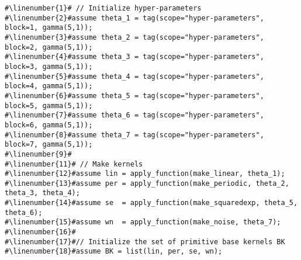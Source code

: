 \begin{mdframed}
\begin{minipage}{\linewidth}
\small
\belowcaptionskip=-10pt
\begin{lstlisting}[mathescape,label=alg:base_kernels,basicstyle=\selectfont\ttfamily,numbers=none,caption={Initialize
Base Kernels BK and $P(n)$},escapechar=\#]
#\linenumber{1}# // Initialize hyper-parameters
#\linenumber{2}#assume theta_1 = tag(scope="hyper-parameters", block=1, gamma(5,1));
#\linenumber{3}#assume theta_2 = tag(scope="hyper-parameters", block=2, gamma(5,1));
#\linenumber{4}#assume theta_3 = tag(scope="hyper-parameters", block=3, gamma(5,1));
#\linenumber{5}#assume theta_4 = tag(scope="hyper-parameters", block=4, gamma(5,1));
#\linenumber{6}#assume theta_5 = tag(scope="hyper-parameters", block=5, gamma(5,1));
#\linenumber{7}#assume theta_6 = tag(scope="hyper-parameters", block=6, gamma(5,1));
#\linenumber{8}#assume theta_7 = tag(scope="hyper-parameters", block=7, gamma(5,1));
#\linenumber{9}#
#\linenumber{11}# // Make kernels
#\linenumber{12}#assume lin = apply_function(make_linear, theta_1);
#\linenumber{13}#assume per = apply_function(make_periodic, theta_2, theta_3, theta_4);
#\linenumber{14}#assume se  = apply_function(make_squaredexp, theta_5, theta_6);
#\linenumber{15}#assume wn  = apply_function(make_noise, theta_7);
#\linenumber{16}#
#\linenumber{17}#// Initialize the set of primitive base kernels BK 
#\linenumber{18}#assume BK = list(lin, per, se, wn);
\end{lstlisting}
\end{minipage}
\end{mdframed}

